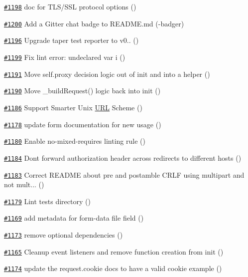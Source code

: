 \begin{DoxyItemize}
\item \href{https://github.com/request/request/pull/1198}{\tt \#1198} doc for T\+L\+S/\+S\+SL protocol options ()
\item \href{https://github.com/request/request/pull/1200}{\tt \#1200} Add a Gitter chat badge to R\+E\+A\+D\+M\+E.\+md (-\/badger)
\item \href{https://github.com/request/request/pull/1196}{\tt \#1196} Upgrade taper test reporter to v0.. ()
\item \href{https://github.com/request/request/pull/1199}{\tt \#1199} Fix lint error\+: undeclared var i ()
\item \href{https://github.com/request/request/pull/1191}{\tt \#1191} Move self.\+proxy decision logic out of init and into a helper ()
\item \href{https://github.com/request/request/pull/1190}{\tt \#1190} Move \+\_\+build\+Request() logic back into init ()
\item \href{https://github.com/request/request/pull/1186}{\tt \#1186} Support Smarter Unix \mbox{\hyperlink{namespace_u_r_l}{U\+RL}} Scheme ()
\item \href{https://github.com/request/request/pull/1178}{\tt \#1178} update form documentation for new usage ()
\item \href{https://github.com/request/request/pull/1180}{\tt \#1180} Enable no-\/mixed-\/requires linting rule ()
\item \href{https://github.com/request/request/pull/1184}{\tt \#1184} Don\textquotesingle{}t forward authorization header across redirects to different hosts ()
\item \href{https://github.com/request/request/pull/1183}{\tt \#1183} Correct R\+E\+A\+D\+ME about pre and postamble C\+R\+LF using multipart and not mult... ()
\item \href{https://github.com/request/request/pull/1179}{\tt \#1179} Lint tests directory ()
\item \href{https://github.com/request/request/pull/1169}{\tt \#1169} add metadata for form-\/data file field ()
\item \href{https://github.com/request/request/pull/1173}{\tt \#1173} remove optional dependencies ()
\item \href{https://github.com/request/request/pull/1165}{\tt \#1165} Cleanup event listeners and remove function creation from init ()
\item \href{https://github.com/request/request/pull/1174}{\tt \#1174} update the request.\+cookie docs to have a valid cookie example ()

\end{DoxyItemize}
